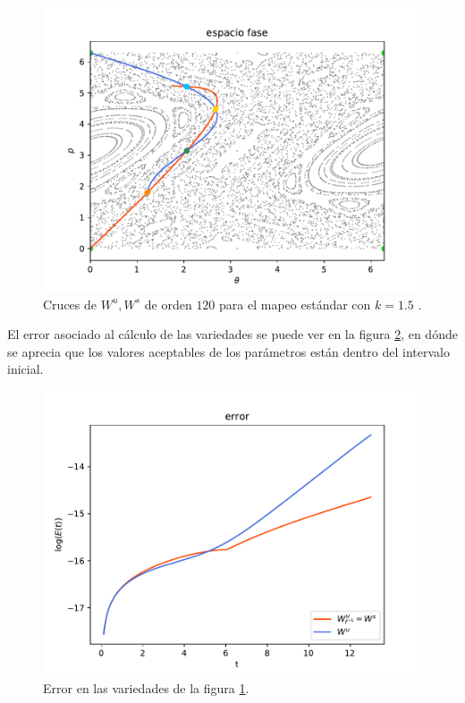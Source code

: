 \begin{figure}[H]
\centering
\includegraphics[scale=0.6]{cruce_estandar}
\caption{Cruces de $W^{u},W^{s}$ de orden $120$ para el mapeo estándar con $k=1.5$ .}
\label{cruce_estandar}
\end{figure}
El error asociado al cálculo de las variedades se puede ver en la figura \ref{errorEstCruces}, en dónde se aprecia que los valores aceptables de los parámetros están dentro del intervalo inicial. 

\begin{figure}[H]
\centering
\includegraphics[scale=0.6]{error_cruces_estandar}
\caption{Error en las variedades de la figura \ref{cruce_estandar}.}
\label{errorEstCruces}
\end{figure}

